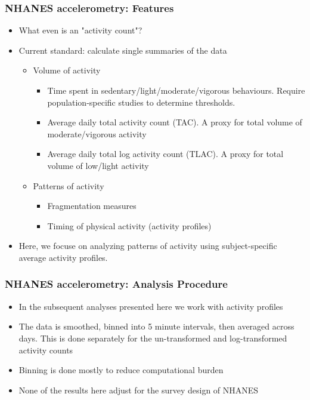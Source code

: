 \documentclass[10pt]{beamer}\usepackage[]{graphicx}\usepackage[]{color}
\begin{document}
\begin{frame}
\frametitle{NHANES accelerometry: Features}
\begin{itemize}
\item What even is an "activity count"?
\item Current standard: calculate single summaries of the data
    \begin{itemize}
    \item Volume of activity\footnotemark
        \begin{itemize}
        \item Time spent in sedentary/light/moderate/vigorous behaviours. Require population-specific studies to determine thresholds.
        \item Average daily total activity count (TAC). A proxy for total volume of moderate/vigorous activity
        \item Average daily total log activity count (TLAC). A proxy for total volume of low/light activity
        \end{itemize}
    \item Patterns of activity
        \begin{itemize}
        \item Fragmentation measures\footnotemark
        \item Timing of physical activity (activity profiles)
        \end{itemize}
    \end{itemize}
\item Here, we focuse on analyzing patterns of activity using subject-specific average activity profiles. 
\end{itemize}


\end{frame}





\begin{frame}
\frametitle{NHANES accelerometry: Analysis Procedure}
\begin{itemize}
\item In the subsequent analyses presented here we work with activity profiles
\item The data is smoothed, binned into 5 minute intervals, then averaged across days. 
This is done separately for the un-transformed and log-transformed activity counts
\item Binning is done mostly to reduce computational burden
\item None of the results here adjust for the survey design of NHANES 
\end{itemize}
\end{frame}
\end{document}
